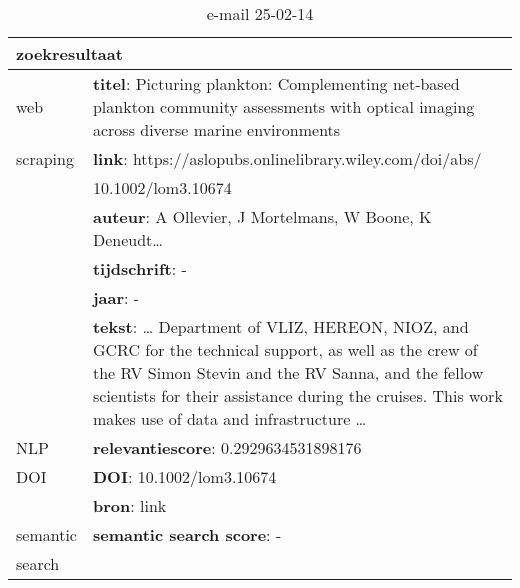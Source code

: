 \begin{table}[h!]
    \caption{e-mail 25-02-14}
    \centering
    \begin{tabularx}{\textwidth}{|p{4cm}|X|} 
        \hline
        \multicolumn{2}{|X|}{\textbf{zoekresultaat}} \\
        \hline
        web &\textbf{titel}: Picturing plankton: Complementing net‐based plankton community assessments with optical imaging across diverse marine environments\\
        scraping&\textbf{link}: https://aslopubs.onlinelibrary.wiley.com/doi/abs/\\&10.1002/lom3.10674\\
        &\textbf{auteur}: A Ollevier, J Mortelmans, W Boone, K Deneudt…\\
        &\textbf{tijdschrift}: -\\
        &\textbf{jaar}: -\\
        &\textbf{tekst}: … Department of VLIZ, HEREON, NIOZ, and GCRC for the technical support, as well as the crew of the RV Simon Stevin and the RV Sanna, and the fellow scientists for their assistance during the cruises. This work makes use of data and infrastructure …\\
        \hline
        NLP&\textbf{relevantiescore}: 0.2929634531898176\\
        \hline
        DOI&\textbf{DOI}: 10.1002/lom3.10674\\
        &\textbf{bron}: link\\
        \hline
        semantic&\textbf{semantic search score}: -\\
        search&\\
        \hline
    \end{tabularx}
    \label{table:email20250214}
\end{table}

